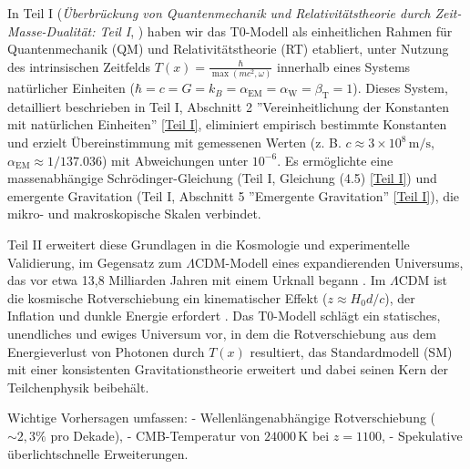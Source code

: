 \documentclass[12pt,a4paper]{article}
\newcommand{\Tfield}{T(x)}
\newcommand{\alphaEM}{\alpha_{\text{EM}}}
\newcommand{\alphaW}{\alpha_{\text{W}}}
\newcommand{\betaT}{\beta_{\text{T}}}
\begin{document}
	In Teil I (\textit{Überbrückung von Quantenmechanik und Relativitätstheorie durch Zeit-Masse-Dualität: Teil I}, \cite{pascher_part1_2025}) haben wir das T0-Modell als einheitlichen Rahmen für Quantenmechanik (QM) und Relativitätstheorie (RT) etabliert, unter Nutzung des intrinsischen Zeitfelds \(\Tfield = \frac{\hbar}{\max(mc^2, \omega)}\) innerhalb eines Systems natürlicher Einheiten (\(\hbar = c = G = k_B = \alphaEM = \alphaW = \betaT = 1\)). Dieses System, detailliert beschrieben in Teil I, Abschnitt 2 ''Vereinheitlichung der Konstanten mit natürlichen Einheiten'' \href{https://github.com/jpascher/T0-Time-Mass-Duality/tree/main/2/pdf/Deutsch/Bridging Quantum Mechanics and Relativity through Time-Mass Duality Part I Theoretical Foundations.pdf}{[Teil I]}, eliminiert empirisch bestimmte Konstanten und erzielt Übereinstimmung mit gemessenen Werten (z. B. \(c \approx 3 \times 10^8 \, \text{m/s}\), \(\alphaEM \approx 1/137.036\)) mit Abweichungen unter \(10^{-6}\). Es ermöglichte eine massenabhängige Schrödinger-Gleichung (Teil I, Gleichung (4.5) \href{https://github.com/jpascher/T0-Time-Mass-Duality/tree/main/2/pdf/Deutsch/Bridging Quantum Mechanics and Relativity through Time-Mass Duality Part I Theoretical Foundations.pdf}{[Teil I]}) und emergente Gravitation (Teil I, Abschnitt 5 ''Emergente Gravitation'' \href{https://github.com/jpascher/T0-Time-Mass-Duality/tree/main/2/pdf/Deutsch/Bridging Quantum Mechanics and Relativity through Time-Mass Duality Part I Theoretical Foundations.pdf}{[Teil I]}), die mikro- und makroskopische Skalen verbindet.
	
	Teil II erweitert diese Grundlagen in die Kosmologie und experimentelle Validierung, im Gegensatz zum \(\Lambda\)CDM-Modell eines expandierenden Universums, das vor etwa 13,8 Milliarden Jahren mit einem Urknall begann \cite{Planck2020}. Im \(\Lambda\)CDM ist die kosmische Rotverschiebung ein kinematischer Effekt (\(z \approx H_0 d / c\)), der Inflation und dunkle Energie erfordert \cite{Riess1998,Perlmutter1999}. Das T0-Modell schlägt ein statisches, unendliches und ewiges Universum vor, in dem die Rotverschiebung aus dem Energieverlust von Photonen durch \(\Tfield\) resultiert, das Standardmodell (SM) mit einer konsistenten Gravitationstheorie erweitert und dabei seinen Kern der Teilchenphysik beibehält.
	
	Wichtige Vorhersagen umfassen:
	- Wellenlängenabhängige Rotverschiebung (\(\sim 2,3\%\) pro Dekade),
	- CMB-Temperatur von \(24000 \, \text{K}\) bei \(z = 1100\),
	- Spekulative überlichtschnelle Erweiterungen.
	
\end{document}
